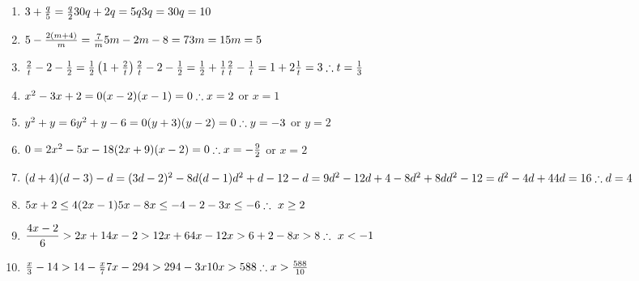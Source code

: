 \begin{eocsolutions}{}
{\begin{enumerate}[itemsep=7pt, label=\textbf{\arabic*}. ]
\begin{multicols}{2}
\begin{enumerate}[itemsep=6pt,label=\textbf{(\alph*)}]
\item $3+\frac{q}{5} = \frac{q}{2}\\30q+2q=5q\\3q=30\\q=10$
\item $5-\frac{2(m+4)}{m} = \frac{7}{m}\\ 5m-2m-8=7\\3m=15\\m=5$
\item $\frac{2}{t} - 2 - \frac{1}{2} = \frac{1}{2}\left(1+\frac{2}{t}\right)\\ \frac{2}{t} - 2 - \frac{1}{2} = \frac{1}{2} +\frac{1}{t}\\
\frac{2}{t} - \frac{1}{t} = 1+2\\
\frac{1}{t}=3\\
\therefore t=\frac{1}{3}$
\item $x^{2} - 3x + 2=0\\
(x-2)(x-1)=0\\
\therefore x = 2$ or $x=1$
\item $y^{2} + y = 6\\
y^2+y-6=0\\
(y+3)(y-2)=0\\
\therefore y=-3$ or $y=2$
\item $0=2x^{2} - 5x - 18\\
(2x+9)(x-2)=0\\ \therefore x = -\frac{9}{2}$ or $ x=2$
\item $(d+4)(d-3)-d=(3d-2)^{2} - 8d(d-1)\\
d^2+d-12-d=9d^2-12d+4-8d^2+8d\\
d^2-12 = d^2 -4d +4\\
4d=16\\
\therefore d=4$
\item $5x+2\leq4(2x-1)\\
5x-8x \leq -4-2\\
-3x \leq -6\\
\therefore~ x \geq 2$
\item $\dfrac{4x-2}{6} > 2x+1\\
4x-2 > 12x+6\\
4x-12x >6+2\\
-8x > 8\\
\therefore~x<-1$
\item $\frac{x}{3} - 14 > 14 - \frac{x}{7}\\
7x - 294 > 294-3x\\
10x > 588\\
\therefore x > \frac{588}{10}$

\end{enumerate}
\end{multicols}
\end{enumerate}}
\end{eocsolutions}
